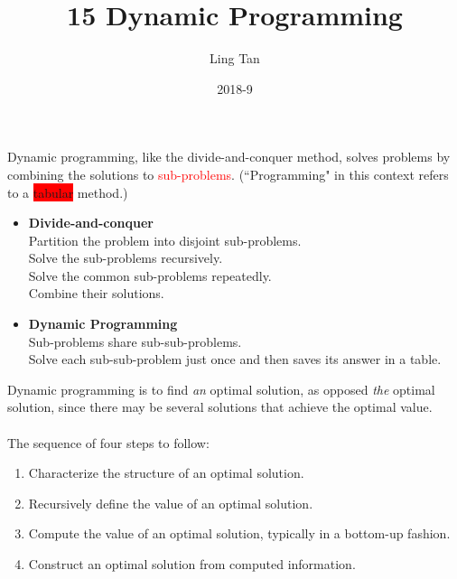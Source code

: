 \documentclass[a4paper]{article}
\title{15 Dynamic Programming}
\author{Ling Tan}
\date{2018-9}
\begin{document}

Dynamic programming, like the divide-and-conquer method, solves problems by combining the solutions to \textcolor{red}{sub-problems}. (``Programming" in this context refers to a \colorbox{red}{tabular} method.)
\begin{itemize}
    \item \textbf{Divide-and-conquer}\\
    Partition the problem into disjoint sub-problems.\\
    Solve the sub-problems recursively.\\
    Solve the common sub-problems repeatedly.\\
    Combine their solutions.
    \item \textbf{Dynamic Programming}\\
    Sub-problems share sub-sub-problems.\\
    Solve each sub-sub-problem just once and then saves its answer in a table.
\end{itemize}
Dynamic programming is to find \textit{an} optimal solution, as opposed \textit{the} optimal solution, since there may be several solutions that achieve the optimal value. 
\\
\\
The sequence of four steps to follow:
\begin{enumerate}
    \item Characterize the structure of an optimal solution.
    \item Recursively define the value of an optimal solution.
    \item Compute the value of an optimal solution, typically in a bottom-up fashion.
    \item Construct an optimal solution from computed information.
\end{enumerate}
\end{document}
